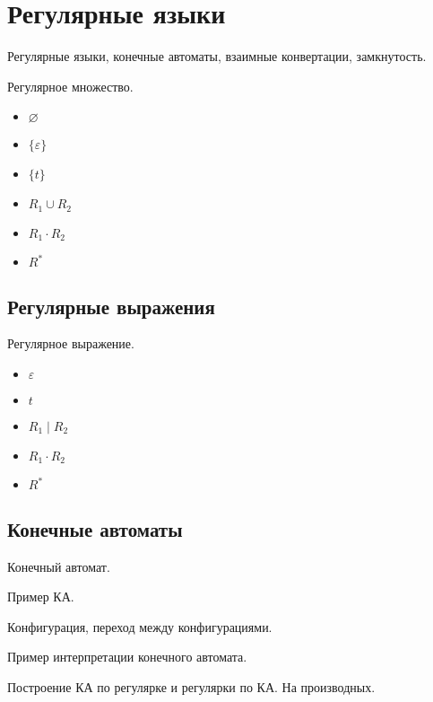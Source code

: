 \chapter{Регулярные языки}



Регулярные языки, конечные автоматы, взаимные конвертации, замкнутость.

\begin{definition}
    Регулярное множество.
    \begin{itemize}
        \item $\varnothing$
        \item $\{\varepsilon\}$
        \item $\{t\}$
        \item $R_1 \cup R_2$
        \item $R_1 \cdot R_2$
        \item $R^*$
    \end{itemize}
\end{definition}

\section{Регулярные выражения}

\begin{definition}
    Регулярное выражение.
    \begin{itemize}
        \item $\varepsilon$
        \item $t$
        \item $R_1 \mid R_2$
        \item $R_1 \cdot R_2$
        \item $R^*$
    \end{itemize}
\end{definition}

\section{Конечные автоматы}

\begin{definition}
    Конечный автомат.
\end{definition}

Пример КА.

Конфигурация, переход между конфигурациями.

Пример интерпретации конечного автомата.

Построение КА по регулярке и регулярки по КА. На производных.

